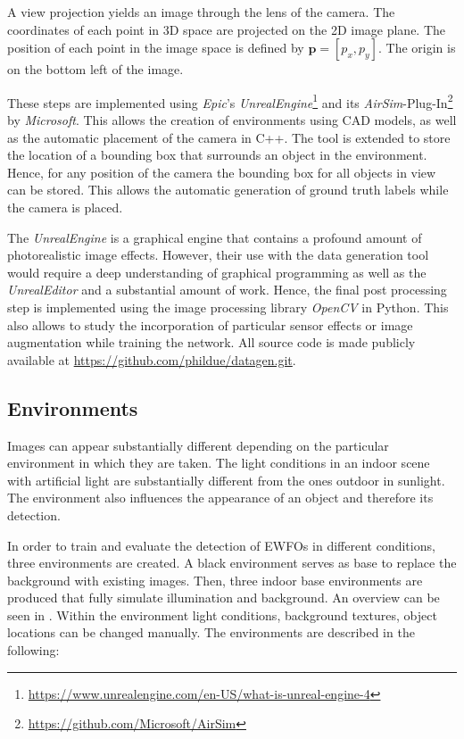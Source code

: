 A view projection yields an image through the lens of the camera. The coordinates of each point in 3D space are projected on the 2D image plane. The position of each point in the image space is defined by $\textbf{p} = [p_x,p_y]$. The origin is on the bottom left of the image.

These steps are implemented using \textit{Epic}'s \textit{UnrealEngine}\footnote{\url{https://www.unrealengine.com/en-US/what-is-unreal-engine-4}} and its \textit{AirSim}-Plug-In\footnote{\url{https://github.com/Microsoft/AirSim}} by \textit{Microsoft}. This allows the creation of environments using \ac{CAD} models, as well as the automatic placement of the camera in C++. The tool is extended to store the location of a bounding box that surrounds an object in the environment. Hence, for any position of the camera the bounding box for all objects in view can be stored. This allows the automatic generation of ground truth labels while the camera is placed.

The \textit{UnrealEngine} is a graphical engine that contains a profound amount of photorealistic image effects. However, their use with the data generation tool would require a deep understanding of graphical programming as well as the \textit{UnrealEditor} and a substantial amount of work. Hence, the final post processing step is implemented using the image processing library \textit{OpenCV} in Python. This also allows to study the incorporation of particular sensor effects or image augmentation while training the network.
All source code is made publicly available at \url{https://github.com/phildue/datagen.git}.

\subsection{Environments}
\label{sec:environments}
Images can appear substantially different depending on the particular environment in which they are taken. The light conditions in an indoor scene with artificial light are substantially different from the ones outdoor in sunlight. The environment also influences the appearance of an object and therefore its detection.

In order to train and evaluate the detection of \acp{EWFO} in different conditions, three environments are created. A black environment serves as base to replace the background with existing images. Then, three indoor base environments are produced that fully simulate illumination and background. An overview can be seen in . Within the environment light conditions, background textures, object locations can be changed manually. The environments are described in the following:


